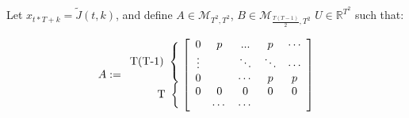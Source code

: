 \documentclass[12pt]{article}
\begin{document}
\begin{enumerate}
  Let $x_{t*T + k} = \tilde J(t, k)$, and define $A \in \mathcal M_{T^2, T^2}$,
  $B \in \mathcal M_{\frac{T(T-1)}{2}, T^2}$ $U \in \mathbb R^{T^2}$ such that:

  \[
    A := 
    \begin{array}{r@{}}
      \text{T(T-1)}~\left\{\begin{array}{@{}c@{}}\null\\\null\\\null\end{array}\right.\\
      \text{T}~\left\{\begin{array}{@{}c@{}}\null\\\null\end{array}\right.\\
    \end{array}
  \left [
    \begin{array}{ccccc}
      0               & p                     & ...  & p     & \cdots \\
      \vdots          &                       & \ddots & \ddots& \cdots \\
      0               &                       & \cdots & p     & p  \\
      0               & 0                     & 0      & 0     & 0      \\
                      & \cdots                & \cdots &       & 
    \end{array}
  \right ]
\]



\end{enumerate}
\end{document}
